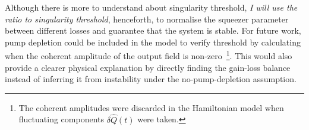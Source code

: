 Although there is more to understand about singularity threshold, \emph{I will use the ratio to singularity threshold}, henceforth, to normalise the squeezer parameter between different losses and guarantee that the system is stable. For future work, pump depletion could be included in the model to verify threshold by calculating when the coherent amplitude of the output field is non-zero~\footnote{The coherent amplitudes were discarded in the Hamiltonian model when fluctuating components $\delta\hat{Q}(t)$ were taken.}. This would also provide a clearer physical explanation by directly finding the gain-loss balance instead of inferring it from instability under the no-pump-depletion assumption.


